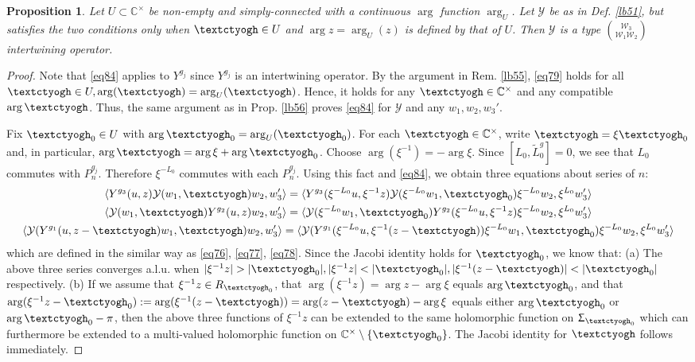 \documentclass[12pt,a4paper,notitlepage]{article}
\theoremstyle{definition}
\theoremstyle{plain}
\newtheorem{pp}[df]{Proposition}
\newcommand{\mc}{\mathcal}
\newcommand{\wtd}{\widetilde}
\newcommand{\bk}[1]{\langle {#1}\rangle}
\newcommand{\Cbb}{\mathbb C}
\newcommand{\tipaz}{\text{\textctyogh}}
\numberwithin{equation}{subsection}
\begin{document}
\begin{pp}\label{lb57}
Let $U\subset\Cbb^\times$ be non-empty and simply-connected with a continuous $\arg$ function $\arg_U$. Let $\mc Y$ be as in Def. \ref{lb51}, but satisfies the two conditions only when $\tipaz\in U$ and $\arg z=\arg_U(z)$ is defined by that of $U$. Then $\mc Y$ is a type $\mc W_3\choose\mc W_1\mc W_2$ intertwining operator.
\end{pp}





\begin{proof}
Note that \eqref{eq84} applies to $Y^{g_j}$ since $Y^{g_j}$ is an intertwining operator. By the argument in Rem. \ref{lb55}, \eqref{eq79} holds  for all $\tipaz\in U,\arg(\tipaz)=\arg_U(\tipaz)$. Hence, it holds for any $\tipaz\in\Cbb^\times$ and any compatible $\arg\tipaz$. Thus, the same argument as in Prop. \ref{lb56} proves \eqref{eq84} for $\mc Y$ and any $w_1,w_2,w_3'$.

Fix $\tipaz_0\in U$ with $\arg\tipaz_0=\arg_U(\tipaz_0)$. For each $\tipaz\in\Cbb^\times$, write $\tipaz=\xi\tipaz_0$ and, in particular, $\arg\tipaz=\arg\xi+\arg\tipaz_0$. Choose $\arg(\xi^{-1})=-\arg\xi$. Since $[L_0,\wtd L_0^g]=0$, we see that $L_0$ commutes with $P_n^{g_j}$. Therefore $\xi^{-L_0}$ commutes with each $P_n^{g_j}$. Using this fact and \eqref{eq84}, we obtain three equations about series of $n$:
\begin{gather*}
\bk{Y^{g_3}(u,z)\mc Y(w_1,\tipaz)w_2,w_3'}=\bk{Y^{g_3}(\xi^{-L_0}u,\xi^{-1}z)\mc Y(\xi^{-L_0}w_1,\tipaz_0)\xi^{-L_0}w_2,\xi^{L_0}w_3'}\\
\bk{\mc Y(w_1,\tipaz)Y^{g_2}(u,z)w_2,w_3'}=\bk{\mc Y(\xi^{-L_0}w_1,\tipaz_0)Y^{g_2}(\xi^{-L_0}u,\xi^{-1}z)\xi^{-L_0}w_2,\xi^{L_0}w_3'}\\
\bk{\mc Y(Y^{g_1}(u,z-\tipaz)w_1,\tipaz)w_2,w'_3}=\bk{\mc Y(Y^{g_1}(\xi^{-L_0}u,\xi^{-1}(z-\tipaz))\xi^{-L_0}w_1,\tipaz_0)\xi^{-L_0}w_2,\xi^{L_0}w'_3}	
\end{gather*}
which are defined in the similar way as \eqref{eq76}, \eqref{eq77}, \eqref{eq78}. Since the Jacobi identity holds for $\tipaz_0$, we know that: (a) The above three series converges a.l.u. when $|\xi^{-1}z|>|\tipaz_0|,|\xi^{-1}z|<|\tipaz_0|,|\xi^{-1}(z-\tipaz)|<|\tipaz_0|$ respectively. (b) If we assume that $\xi^{-1}z\in R_{\tipaz_0}$, that $\arg(\xi^{-1}z)=\arg z-\arg\xi$ equals $\arg\tipaz_0$, and that $\arg(\xi^{-1}z-\tipaz_0):=\arg(\xi^{-1}(z-\tipaz))=\arg(z-\tipaz)-\arg\xi$ equals either $\arg \tipaz_0$ or $\arg\tipaz_0-\pi$, then the above three functions of $\xi^{-1}z$ can be extended to  the same holomorphic function on $\Upsigma_{\tipaz_0}$ which can furthermore be extended to a multi-valued holomorphic function on $\Cbb^\times\setminus\{\tipaz_0\}$. The Jacobi identity for $\tipaz$ follows immediately.
\end{proof}
\end{document}
